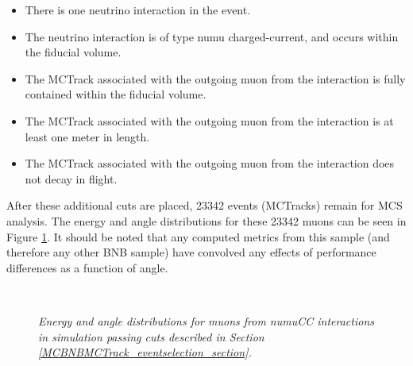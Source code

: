 \begin{itemize}
\item There is one neutrino interaction in the event.
\item The neutrino interaction is of type numu charged-current, and occurs within the fiducial volume.
\item The {\sc MCTrack} associated with the outgoing muon from the interaction is fully contained within the fiducial volume.
\item The {\sc MCTrack} associated with the outgoing muon from the interaction is at least one meter in length.
\item The {\sc MCTrack} associated with the outgoing muon from the interaction does not decay in flight.
\end{itemize}
After these additional cuts are placed, 23342 events ({\sc MCTracks}) remain for MCS analysis. The energy and angle distributions for these 23342 muons can be seen in Figure \ref{BNBmuon_energy_angle_fig}. It should be noted that any computed metrics from this sample (and therefore any other BNB sample) have convolved any effects of performance differences as a function of angle.\\

\begin{figure}
\centering
\mbox{
	\quad
	}
\caption{\textit{Energy and angle distributions for muons from numuCC interactions in \ub simulation passing cuts described in Section \ref{MCBNBMCTrack_eventselection_section}.}}
\label{BNBmuon_energy_angle_fig}
\end{figure}



